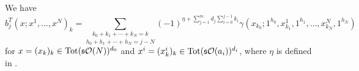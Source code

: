 \documentclass[join.tex]{subfiles}
\begin{document}
\begin{lem}
We have 
\begin{equation}\label{bracetot}
b_j^T(x;x^1,\dots, x^N)_k=\underset{h_0+h_1+\cdots+h_N=j-N}{\sum_{k_0+k_1+\cdots+k_N=k}}(-1)^{\eta+\sum_{j=1}^m d_j\sum_{i=0}^{j-1}k_i}\gamma(x_{k_0};1^{h_0},x^1_{k_1},1^{h_1},\dots, x^N_{k_N},1^{h_N})
\end{equation}
for $x=(x_k)_k\in\mathrm{Tot}(\mathfrak{s}{\mathcal O}(N))^{d_0}$ and $x^i=(x^i_k)_k\in\mathrm{Tot}(\mathfrak{s}{\mathcal O}(a_i))^{d_i}$, where $\eta$ is defined in . 
\end{lem}
%
%
\end{document}
